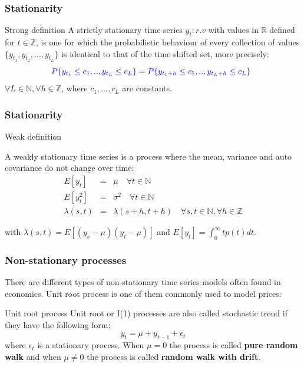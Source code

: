 \documentclass{beamer}
\begin{document}
\begin{frame}
\frametitle{Stationarity}
\begin{block}{Strong definition}
A {\color{red}strictly stationary time series} $y_t: r.v$ with values in $\mathbb{R}$ defined for $t \in \mathbb{Z}$, is one for which the probabilistic behaviour of every collection of values $\{y_{t_1},y_{t_2},\dots,y_{t_L}\}$ is identical to that of the time shifted set, more precisely:
\begin{equation*}
{\color{blue}
P\{y_{t_1} \leq
c_1,..,y_{t_L} \leq c_L\} = P\{y_{t_1+h} \leq c_1,..,y_{t_L+h} \leq c_L\}\enspace }
\end{equation*}
\noindent $\forall L \in \mathbb{N}, \forall h \in \mathbb{Z}$, where $c_1,\dots,c_L$ are constants.
\end{block}
\end{frame}

\begin{frame}
\frametitle{Stationarity}
\begin{block}{Weak definition}

A weakly stationary time series is a process where the  mean, variance and auto covariance do not change over time:
\small
{\color{blue}
 \begin{eqnarray*} E[y_t] &=& \mu  \quad
\forall t \in \mathbb{N} \\ E[y^2_t] &=& \sigma^2  \quad \forall t \in
\mathbb{N} \\ \lambda(s,t)&=&\lambda(s+h,t+h) \quad \forall s,t \in \mathbb{N},
\forall h \in \mathbb{Z} \end{eqnarray*}}
\end{block}
\noindent with $\lambda(s,t) = E[(y_s-\mu)(y_t - \mu)]$ and $E[y_t]= \displaystyle \int_0^\infty t p(t)dt$. 
\end{frame}

\begin{frame}
\frametitle{Non-stationary processes}
There are different types of non-stationary time series models often found in economics. Unit root process is one of them commonly used to model prices:
\begin{block}{Unit root process}
{\color{red}Unit root or I(1)} processes are also called stochastic trend if they have the following form:
{\color{blue}
\[
y_t = \mu + y_{t-1} + \epsilon_t
\]}
\noindent where $\epsilon_t$ is a stationary process. When $\mu = 0 $ the process is called {\bf pure random walk} and when $\mu \neq 0$  the process is called {\bf random walk with drift}.
\end{block}
\end{frame}
\end{document}
